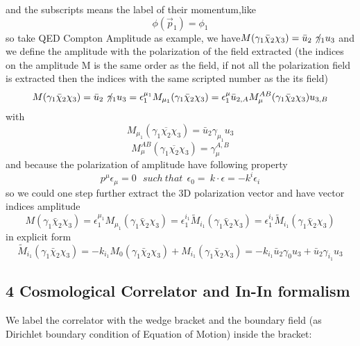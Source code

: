 \documentclass[11pt,a4paper]{article}
\begin{document}
and the subscripts means the label of their momentum,like
\begin{equation}
\phi(\vec p_1) = \phi_1
\end{equation}
so take QED Compton Amplitude as example, we have$M(\gamma_1 \bar\chi_2 \chi_3)=\bar u_2 \not \! \gamma_1u_3 $ and we define the amplitude with the polarization of the field extracted (the indices on the amplitude M is the same order as the field, if not all the polarization field is extracted then the indices with the same scripted number as the its field)
\begin{equation}
M(\gamma_1 \bar\chi_2 \chi_3)=\bar u_2 \not \! \gamma_1u_3 = \epsilon_1^{\mu_1} M_{\mu_1}(\gamma_{1} \bar\chi_2 \chi_3) =  \epsilon_1^\mu \bar u_{2,A} M^{AB}_{\mu}(\gamma_{1} \bar\chi_2 \chi_3) u_{3,B}
\end{equation}
with 
\begin{equation}
M_{\mu_1}(\gamma_1\overline{\chi_2} \chi_3) = \bar u_2  \gamma_{\mu_1}u_3
\end{equation}
\begin{equation}
M^{AB}_\mu(\gamma_1\overline{\chi_2} \chi_3) =  \gamma^{A,B}_{\mu}
\end{equation}
and because the polarization of amplitude have following property
\begin{equation}
p^{\mu } \epsilon _{\mu } =0\ \ \ such\ that\ \ \epsilon _{0} =\  {k} \cdot  {\epsilon }=- k^i \epsilon_i
\end{equation}
so we could one step further extract the 3D polarization vector and have vector indices amplitude
\begin{equation}
M(\gamma_1 \bar\chi_2 \chi_3) = \epsilon_1^{\mu_1} M_{\mu_1}(\gamma_{1} \bar\chi_2 \chi_3) = \epsilon_1^{i_1} \tilde{M}_{i_1}(\gamma_{1} \bar\chi_2 \chi_3) = {\epsilon}^{i_1}_1  {\tilde{M}}_{i_1}(\gamma_{1} \bar\chi_2 \chi_3) 
\end{equation}in explicit form
\begin{equation}
\tilde{M}_{i_1}(\gamma_{1} \bar\chi_2 \chi_3)  = -k_{i_1} M_0(\gamma_{1} \bar\chi_2 \chi_3) +M_{i_1}(\gamma_{1} \bar\chi_2 \chi_3) = -k_{i_1}\bar u_2 \gamma_0 u_3 + \bar u_2 \gamma_{i_1} u_3
\end{equation}

\subsection{4 Cosmological Correlator and In-In formalism}
We label the correlator with the wedge bracket and the boundary field (as Dirichlet boundary condition of Equation of Motion) inside the bracket:
\end{document}
